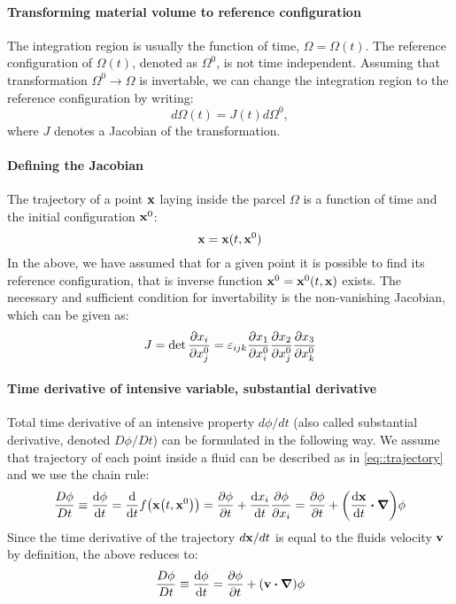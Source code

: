 \documentclass{article}
\providecommand{\levicivita}[3]{%
  \ensuremath{\varepsilon_{{#1}{#2}{#3}}}
}
\begin{document}
\paragraph{Transforming material volume to reference configuration}
The integration region is usually the function of time, \(\Omega = \Omega(t)\).
The reference configuration of \(\Omega(t)\), denoted as \(\Omega^0\), is not 
time independent. Assuming that transformation \(\Omega^0 \rightarrow \Omega\)
is invertable, we can change the integration region to the reference
configuration by writing:
\begin{equation}
  d\Omega(t) = J(t)d\Omega^0,
  \label{eq::jacobian_relation}
\end{equation}
where \(J\) denotes a Jacobian of the transformation.

\paragraph{Defining the Jacobian}
The trajectory of a point \(\vb{x}\) laying inside 
the parcel \(\Omega\) is a function of time and the initial 
configuration \(\vb{x}^0\):
\begin{equation}
  \vb{x} = \vb{x}(t, \vb{x}^0)
  \label{eq::trajectory}
\end{equation}
In the above, we have assumed that for a given point it is possible 
to find its reference configuration, that is inverse function 
\(\vb{x}^0 = \vb{x}^0(t, \vb{x})\) exists.
The necessary and sufficient condition for invertability is the 
non-vanishing Jacobian, which can be given as:
\begin{equation}\label{eq::jacobian}
  J = \det\pdv{x_i}{x^0_j} 
  = \levicivita{i}{j}{k} \pdv{x_1}{x^0_i}\pdv{x_2}{x^0_j}\pdv{x_3}{x^0_k}
\end{equation}

\paragraph{Time derivative of intensive variable, substantial derivative}
Total time derivative of an intensive property \(d \phi / d t\) 
(also called substantial derivative, denoted \(D\phi/Dt\)) can be formulated 
in the following way. We assume that trajectory of each point inside a fluid can
be described as in \autoref{eq::trajectory} and 
we use the chain rule:
\begin{equation*}
  \dfrac{D\phi}{Dt} \equiv \dv{\phi}{t}  
  =  \dv{t}f\qty(\vb{x}\qty(t,\vb{x}^0))
  = \pdv{\phi}{t} + \dv{x_i}{t} \pdv{\phi}{x_i}
  = \pdv{\phi}{t} + \qty(\dv{\vb{x}}{t} \dotproduct \grad )\phi
\end{equation*}
Since the time derivative of the trajectory \(d\vb{x} / dt\) is equal 
to the fluids velocity \(\vb{v}\) by definition, the above reduces to:
\begin{equation}
  \dfrac{D\phi}{Dt} \equiv \dv{\phi}{t} 
  = \pdv{\phi}{t} + (\vb{v} \dotproduct \grad) \phi
\end{equation}
\end{document}
